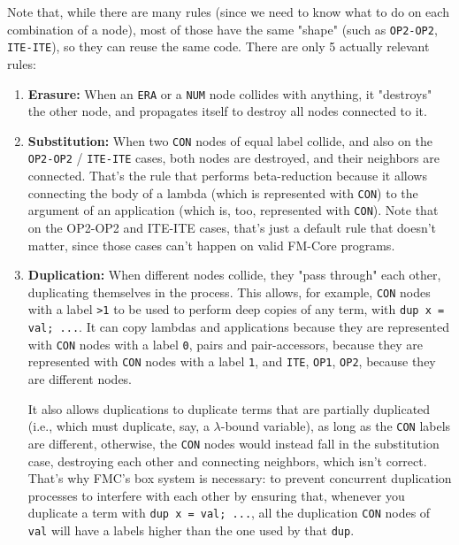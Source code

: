 \documentclass{article}
\theoremstyle{definition}
\theoremstyle{theorem}
\begin{document}
Note that, while there are many rules (since we need to know what to do on each
combination of a node), most of those have the same "shape" (such as
\verb|OP2-OP2|, \verb|ITE-ITE|), so they can reuse the same code. There are only
5 actually relevant rules:

\begin{enumerate}
  \item \textbf{Erasure:} When an \verb|ERA| or a \verb|NUM| node collides with
  anything, it "destroys" the other node, and propagates itself to destroy all
  nodes connected to it.

  \item \textbf{Substitution:} When two \verb|CON| nodes of equal label collide,
  and also on the \verb|OP2-OP2| / \verb|ITE-ITE| cases, both nodes are
  destroyed, and their neighbors are connected.  That's the rule that performs
  beta-reduction because it allows connecting the body of a lambda (which is
  represented with \verb|CON|) to the argument of an application (which is, too,
  represented with \verb|CON|). Note that on the OP2-OP2 and ITE-ITE cases,
  that's just a default rule that doesn't matter, since those cases can't happen
  on valid FM-Core programs.

  \item \textbf{Duplication:} When different nodes collide, they "pass through"
  each other, duplicating themselves in the process. This allows, for example,
  \verb|CON| nodes with a label \verb|>1| to be used to perform deep copies of
  any term, with \verb|dup x = val; ...|. It can copy lambdas and applications
  because they are represented with \verb|CON| nodes with a label \verb|0|,
  pairs and pair-accessors, because they are represented with \verb|CON| nodes
  with a label \verb|1|, and \verb|ITE|, \verb|OP1|, \verb|OP2|, because they
  are different nodes.

  It also allows duplications to duplicate terms that are partially duplicated
  (i.e., which must duplicate, say, a $\lambda$-bound variable), as long as the
  \verb|CON| labels are different, otherwise, the \verb|CON| nodes would instead
  fall in the substitution case, destroying each other and connecting neighbors,
  which isn't correct. That's why FMC's box system is necessary: to prevent
  concurrent duplication processes to interfere with each other by ensuring
  that, whenever you duplicate a term with \verb|dup x = val; ...|, all the
  duplication \verb|CON| nodes of \verb|val| will have a labels higher than the
  one used by that \verb|dup|.


\end{enumerate}
\end{document}
